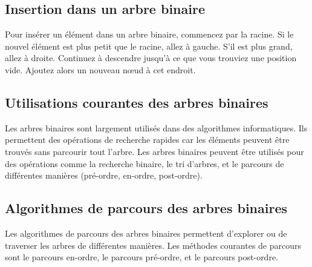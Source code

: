 \subsection{Insertion dans un arbre binaire}
Pour insérer un élément dans un arbre binaire, commencez par la racine. Si le nouvel élément est plus petit que le racine, allez à gauche. S'il est plus grand, allez à droite. Continuez à descendre jusqu'à ce que vous trouviez une position vide. Ajoutez alors un nouveau nœud à cet endroit.

\subsection{Utilisations courantes des arbres binaires}
Les arbres binaires sont largement utilisés dans des algorithmes informatiques. Ils permettent des opérations de recherche rapides car les éléments peuvent être trouvés sans parcourir tout l'arbre. Les arbres binaires peuvent être utilisés pour des opérations comme la recherche binaire, le tri d'arbres, et le parcours de différentes manières (pré-ordre, en-ordre, post-ordre).

\subsection{Algorithmes de parcours des arbres binaires}

Les algorithmes de parcours des arbres binaires permettent d'explorer ou de traverser les arbres de différentes manières. Les méthodes courantes de parcours sont le parcours en-ordre, le parcours pré-ordre, et le parcours post-ordre.

